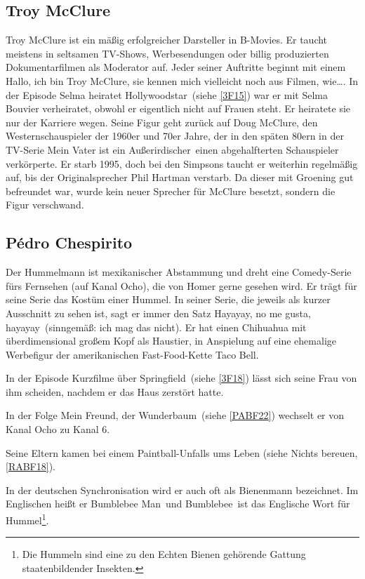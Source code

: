 \subsection{Troy McClure}
Troy McClure ist ein mäßig erfolgreicher Darsteller in B-Movies. Er taucht meistens in seltsamen TV-Shows, Werbesendungen oder billig produzierten Dokumentarfilmen als Moderator auf. Jeder seiner Auftritte beginnt mit einem \glqq Hallo, ich bin Troy McClure, sie kennen mich vielleicht noch aus Filmen, wie\dots \grqq . In der Episode \glqq Selma heiratet Hollywoodstar\grqq\ (siehe \ref{3F15}) war er mit Selma Bouvier verheiratet, obwohl er eigentlich nicht auf Frauen steht. Er heiratete sie nur der Karriere wegen. Seine Figur geht zurück auf Doug McClure, den Westernschauspieler der 1960er und 70er Jahre, der in den späten 80ern in der TV-Serie \glqq Mein Vater ist ein Außerirdischer\grqq\ einen abgehalfterten Schauspieler verkörperte. Er starb 1995, doch bei den Simpsons taucht er weiterhin regelmäßig auf, bis der Originalsprecher Phil Hartman verstarb. Da dieser mit Groening gut befreundet war, wurde kein neuer Sprecher für McClure besetzt, sondern die Figur verschwand.

\subsection{Pédro Chespirito}\label{Hummelmann}
Der Hummelmann ist mexikanischer Abstammung und dreht eine Comedy-Serie fürs Fernsehen (auf Kanal Ocho), die von Homer gerne gesehen wird. Er trägt für seine Serie das Kostüm einer Hummel. In seiner Serie, die jeweils als kurzer Ausschnitt zu sehen ist, sagt er immer den Satz \glqq Hayayay, no me gusta, hayayay\grqq\ (sinngemäß: \glqq ich mag das nicht\grqq ). Er hat einen Chihuahua mit überdimensional großem Kopf als Haustier, in Anspielung auf eine ehemalige Werbefigur der amerikanischen Fast-Food-Kette \glqq Taco Bell\grqq .

In der Episode  Kurzfilme über Springfield\grqq\ (siehe \ref{3F18}) lässt sich seine Frau von ihm scheiden, nachdem er das Haus zerstört hatte.

In der Folge \glqq Mein Freund, der Wunderbaum\grqq\ (siehe \ref{PABF22}) wechselt er von Kanal Ocho zu Kanal 6.

Seine Eltern kamen bei einem Paintball-Unfalls ums Leben (siehe \glqq Nichts bereuen\grqq , \ref{RABF18}).

In der deutschen Synchronisation wird er auch oft als Bienenmann bezeichnet. Im Englischen heißt er \glqq Bumblebee Man\grqq\ und \glqq Bumblebee\grqq\ ist das Englische Wort für Hummel\footnote{Die Hummeln sind eine zu den Echten Bienen gehörende Gattung staatenbildender Insekten.}.

